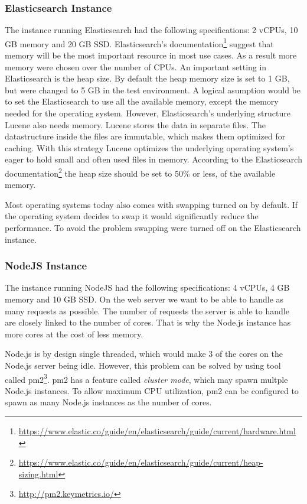 \subsubsection{Elasticsearch Instance}
The instance running Elasticsearch had the following specifications: 2 vCPUs, 10 GB memory and 20 GB SSD.
Elasticsearch's documentation\footnote{\url{https://www.elastic.co/guide/en/elasticsearch/guide/current/hardware.html}}
suggest that memory will be the most important resource in most use cases.
As a result more memory were chosen over the number of CPUs.
An important setting in Elasticsearch is the heap size.
By default the heap memory size is set to 1 GB, but were changed to 5 GB in the test environment.
A logical asumption would be to set the Elasticsearch to use all the available memory, except the memory needed for the operating system.
However, Elasticsearch's underlying structure Lucene also needs memory.
Lucene stores the data in separate files.
The datastructure inside the files are immutable, which makes them optimized for caching.
With this strategy Lucene optimizes the underlying operating system's eager to hold small and often used files in memory.
According to the Elasticsearch documentation\footnote{\url{https://www.elastic.co/guide/en/elasticsearch/guide/current/heap-sizing.html}}
the heap size should be set to 50\% or less, of the available memory.

Most operating systems today also comes with swapping turned on by default.
If the operating system decides to swap it would significantly reduce the performance.
To avoid the problem swapping were turned off on the Elasticsearch instance.

\subsubsection{NodeJS Instance}
The instance running NodeJS had the following specifications: 4 vCPUs, 4 GB memory and 10 GB SSD.
On the web server we want to be able to handle as many requests as possible.
The number of requests the server is able to handle are closely linked to the number of cores.
That is why the Node.js instance has more cores at the cost of less memory.

Node.js is by design single threaded, which would make 3 of the cores on the Node.js server being idle.
However, this problem can be solved by using tool called pm2\footnote{\url{http://pm2.keymetrics.io/}}.
pm2 has a feature called \textit{cluster mode}, which may spawn multple Node.js instances.
To allow maximum CPU utilization, pm2 can be configured to spawn as many Node.js instances as the number of cores.

